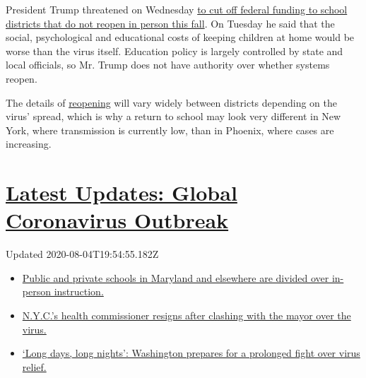 President Trump threatened on Wednesday
\href{https://www.nytimes.com/2020/07/08/us/politics/trump-schools-reopening.html}{to
cut off federal funding to school districts that do not reopen in person
this fall}. On Tuesday he said that the social, psychological and
educational costs of keeping children at home would be worse than the
virus itself. Education policy is largely controlled by state and local
officials, so Mr. Trump does not have authority over whether systems
reopen.

The details of
\href{https://www.nytimes.com/2020/07/16/upshot/coronavirus-school-reopening-private-public-gap.html}{reopening}
will vary widely between districts depending on the virus' spread, which
is why a return to school may look very different in New York, where
transmission is currently low, than in Phoenix, where cases are
increasing.

\hypertarget{latest-updates-global-coronavirus-outbreak}{%
\section{\texorpdfstring{\href{https://www.nytimes.com/2020/08/04/world/coronavirus-cases.html?action=click\&pgtype=Article\&state=default\&region=MAIN_CONTENT_1\&context=storylines_live_updates}{Latest
Updates: Global Coronavirus
Outbreak}}{Latest Updates: Global Coronavirus Outbreak}}\label{latest-updates-global-coronavirus-outbreak}}

Updated 2020-08-04T19:54:55.182Z

\begin{itemize}
\tightlist
\item
  \href{https://www.nytimes.com/2020/08/04/world/coronavirus-cases.html?action=click\&pgtype=Article\&state=default\&region=MAIN_CONTENT_1\&context=storylines_live_updates\#link-4825b93}{Public
  and private schools in Maryland and elsewhere are divided over
  in-person instruction.}
\item
  \href{https://www.nytimes.com/2020/08/04/world/coronavirus-cases.html?action=click\&pgtype=Article\&state=default\&region=MAIN_CONTENT_1\&context=storylines_live_updates\#link-4d1eafa8}{N.Y.C.'s
  health commissioner resigns after clashing with the mayor over the
  virus.}
\item
  \href{https://www.nytimes.com/2020/08/04/world/coronavirus-cases.html?action=click\&pgtype=Article\&state=default\&region=MAIN_CONTENT_1\&context=storylines_live_updates\#link-6b644638}{`Long
  days, long nights': Washington prepares for a prolonged fight over
  virus relief.}
\end{itemize}

